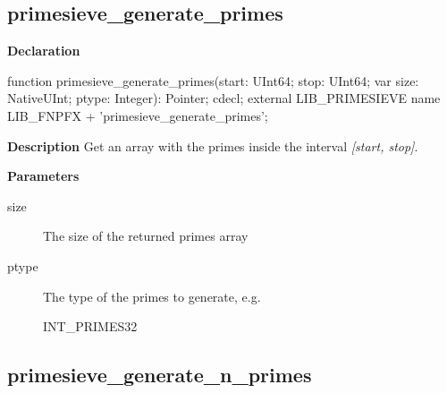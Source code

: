 \documentclass{report}
\newif\ifpdf
\begin{document}
\subsection*{primesieve{\_}generate{\_}primes}
\fi
\label{primesieve-primesieve_generate_primes}
\begin{list}{}{
\setlength{\itemindent}{0cm}
\setlength{\listparindent}{0cm}
\setlength{\leftmargin}{\evensidemargin}
\addtolength{\leftmargin}{\tmplength}
\settowidth{\labelsep}{X}
\addtolength{\leftmargin}{\labelsep}
\setlength{\labelwidth}{\tmplength}
}
\item[\textbf{Declaration}\hfill]
\ifpdf
\begin{flushleft}
\fi
\begin{ttfamily}
function primesieve{\_}generate{\_}primes(start: UInt64; stop: UInt64; var size: NativeUInt; ptype: Integer): Pointer; cdecl; external LIB{\_}PRIMESIEVE name LIB{\_}FNPFX + 'primesieve{\_}generate{\_}primes';\end{ttfamily}

\ifpdf
\end{flushleft}
\fi

\par
\item[\textbf{Description}]
Get an array with the primes inside the interval \textit{[start, stop]}.

 \par
\item[\textbf{Parameters}]
\begin{description}
\item[size] The size of the returned primes array
\item[ptype] The type of the primes to generate, e.g. \begin{ttfamily}INT{\_}PRIMES32\end{ttfamily}
\end{description}


\end{list}
\ifpdf
\subsection*{\large{\textbf{primesieve{\_}generate{\_}n{\_}primes}}\normalsize\hspace{1ex}\hrulefill}
\else
\end{document}
